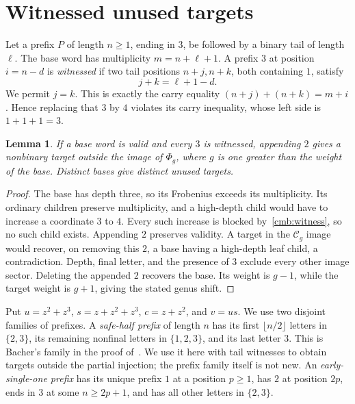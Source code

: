 \documentclass[11pt]{amsart}
\newtheorem{lemma}[theorem]{Lemma}
\theoremstyle{definition}
\theoremstyle{remark}
\numberwithin{equation}{section}
\begin{document}
\section{Witnessed unused targets}
\label{cmb:reservoir}
Let a prefix $P$ of length $n\ge1$, ending in $3$, be followed by a binary
tail of length $\ell$. The base word has multiplicity $m=n+\ell+1$.
A prefix $3$ at position $i=n-d$ is \emph{witnessed} if two tail positions
$n+j,n+k$, both containing $1$, satisfy
\begin{equation}\label{cmb:witness}
 j+k=\ell+1-d.
\end{equation}
We permit $j=k$. This is exactly the carry equality
$(n+j)+(n+k)=m+i$. Hence replacing that $3$ by $4$ violates its carry
inequality, whose left side is $1+1+1=3$.

\begin{lemma}\label{cmb:witness-unused}
If a base word is valid and every $3$ is witnessed, appending $2$ gives a
nonbinary target outside the image of $\Phi_g$, where $g$ is one greater
than the weight of the base. Distinct bases give distinct unused targets.
\end{lemma}
\begin{proof}
The base has depth three, so its Frobenius exceeds its multiplicity. Its
ordinary children preserve multiplicity, and a high-depth child would
have to increase a coordinate $3$ to $4$. Every such increase is blocked
by~\eqref{cmb:witness}, so no such child exists. Appending $2$ preserves
validity. A target in the $\mathcal C_g$ image would recover, on removing
this $2$, a base having a high-depth leaf child, a contradiction. Depth,
final letter, and the presence of $3$ exclude every other image sector.
Deleting the appended $2$ recovers the base. Its weight is $g-1$, while
the target weight is $g+1$, giving the stated genus shift.
\end{proof}

Put $u=z^2+z^3$, $s=z+z^2+z^3$, $c=z+z^2$, and $v=us$.
We use two disjoint families of prefixes. A \emph{safe-half prefix} of
length $n$ has its first $\lfloor n/2\rfloor$ letters in $\{2,3\}$,
its remaining nonfinal letters in $\{1,2,3\}$, and its last letter $3$.
This is Bacher's family in the proof of~\cite[Theorem~15.1, Section~15.1]{Bacher}.
We use it here with tail witnesses to obtain targets outside the partial
injection; the prefix family itself is not new.
An \emph{early-single-one prefix} has its unique prefix $1$ at a position
$p\ge1$, has $2$ at position $2p$, ends in $3$ at some $n\ge2p+1$,
and has all other letters in $\{2,3\}$.
\end{document}
